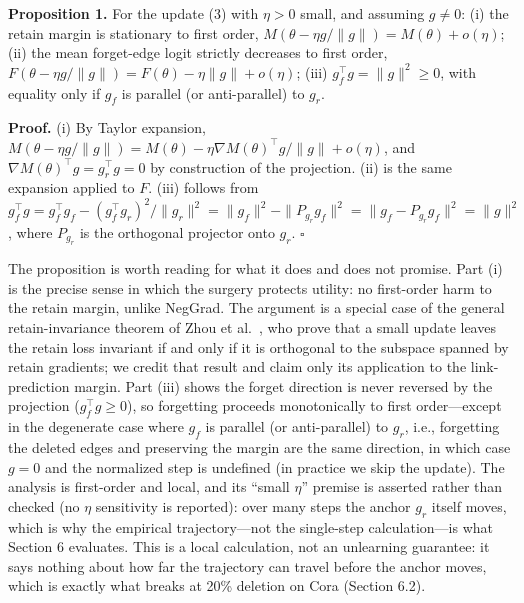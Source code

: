 \documentclass[pdflatex,sn-basic,Numbered]{sn-jnl}
\begin{document}
\textbf{Proposition 1.} For the update (3) with $\eta > 0$ small, and assuming $g \neq 0$: (i) the retain margin is stationary to first order, $M(\theta - \eta g/\|g\|) = M(\theta) + o(\eta)$; (ii) the mean forget-edge logit strictly decreases to first order, $F(\theta - \eta g/\|g\|) = F(\theta) - \eta\|g\| + o(\eta)$; (iii) $g_f^\top g = \|g\|^2 \geq 0$, with equality only if $g_f$ is parallel (or anti-parallel) to $g_r$.

\textbf{Proof.} (i) By Taylor expansion, $M(\theta - \eta g/\|g\|) = M(\theta) - \eta \nabla M(\theta)^\top g/\|g\| + o(\eta)$, and $\nabla M(\theta)^\top g = g_r^\top g = 0$ by construction of the projection. (ii) is the same expansion applied to $F$. (iii) follows from $g_f^\top g = g_f^\top g_f - (g_f^\top g_r)^2/\|g_r\|^2 = \|g_f\|^2 - \|P_{g_r} g_f\|^2 = \|g_f - P_{g_r} g_f\|^2 = \|g\|^2$, where $P_{g_r}$ is the orthogonal projector onto $g_r$. $\square$

The proposition is worth reading for what it does and does not promise. Part (i) is the precise sense in which the surgery protects utility: no first-order harm to the retain margin, unlike NegGrad. The argument is a special case of the general retain-invariance theorem of Zhou et al.\ \cite{gu2025}, who prove that a small update leaves the retain loss invariant if and only if it is orthogonal to the subspace spanned by retain gradients; we credit that result and claim only its application to the link-prediction margin. Part (iii) shows the forget direction is never reversed by the projection ($g_f^\top g \geq 0$), so forgetting proceeds monotonically to first order---except in the degenerate case where $g_f$ is parallel (or anti-parallel) to $g_r$, i.e., forgetting the deleted edges and preserving the margin are the same direction, in which case $g = 0$ and the normalized step is undefined (in practice we skip the update). The analysis is first-order and local, and its ``small $\eta$'' premise is asserted rather than checked (no $\eta$ sensitivity is reported): over many steps the anchor $g_r$ itself moves, which is why the empirical trajectory---not the single-step calculation---is what Section 6 evaluates. This is a local calculation, not an unlearning guarantee: it says nothing about how far the trajectory can travel before the anchor moves, which is exactly what breaks at 20\% deletion on Cora (Section 6.2).
\end{document}
